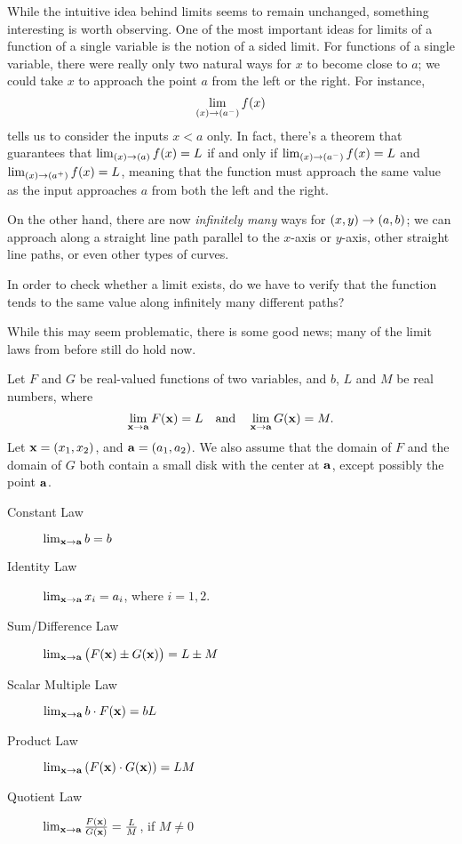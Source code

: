 \documentclass{ximera}
\begin{document}
While the intuitive idea behind limits seems to remain unchanged, something interesting is worth observing.  One of the most important ideas for limits of a function of a single variable is the notion of a sided limit.  For functions of a single variable, there were really only two natural ways for $x$ to become close to $a$; we could take $x$ to approach the point $a$ from the left or the right.  For instance,
\[
\lim_{\left(x\right) \to \left(a^-\right)}f(x)
\]
tells us to consider the inputs $x<a$ only.  In fact, there's a theorem that guarantees that $\lim_{\left(x\right) \to \left(a\right)} f(x) = L$ if and only if $\lim_{\left(x\right) \to \left(a^-\right)}f(x) =L$ and $\lim_{\left(x\right) \to \left(a^+\right)}f(x) =L$, meaning that the function must approach the same value as the input approaches $a$ from both the left and the right.

On the other hand, there are now \emph{infinitely many} ways for $\left(x,y\right) \to \left(a,b\right)$; we can approach along a straight line path parallel to the $x$-axis or $y$-axis, other straight line paths, or even other types of curves.


In order to check whether a limit exists, do we have to verify that the function tends to the same value along infinitely many different paths?

  While this may seem problematic, there is some good news; many of the limit laws from before still do hold now.

\begin{theorem}
  Let $F$ and $G$ be real-valued functions of two
  variables, and $b$, $L$ and $M$ be real numbers, where
  \[
  \lim_{\mathbf{x}\to\mathbf{a}}F(\mathbf{x}) = L \quad \text{and}\quad \lim_{\mathbf{x}\to\mathbf{a}} G(\mathbf{x}) = M.
  \]
Let $\mathbf{x} = \left(x_{1},x_{2}\right)$, and $\mathbf{a} = \left(a_{1},a_{2}\right)$. We  also assume that  the domain of $F$ and the domain of $G$
 both  contain a small disk with the center at $\mathbf{a}$, except possibly the point $\mathbf{a}$.
\begin{description}
\item[Constant Law] $\lim_{\mathbf{x}\to \mathbf{a}} b = b$
\item[Identity Law] $\lim_{\mathbf{x}\to \mathbf{a}} x_i = a_i$, where $i=1,2.$
\item[Sum/Difference Law] $\lim_{\mathbf{x}\to \mathbf{a}}\big(F(\mathbf{x})\pm G(\mathbf{x})\big) = L\pm M$
\item[Scalar Multiple Law] $\lim_{\mathbf{x}\to \mathbf{a}} b\cdot F(\mathbf{x}) = bL$
\item[Product Law] $\lim_{\mathbf{x}\to \mathbf{a}} \left(F(\mathbf{x})\cdot G(\mathbf{x})\right) = LM$
\item[Quotient Law] $\lim_{\mathbf{x}\to \mathbf{a}} \frac{F(\mathbf{x})}{G(\mathbf{x})} = \frac{L}{M}$, if $M\neq 0$
\end{description}
\end{theorem}
\end{document}
